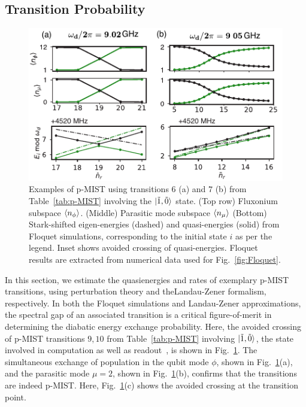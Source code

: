 \documentclass[%
reprint,
superscriptaddress,
 amsmath,amssymb,
 aps,
 prx,
longbibliography,
floatfix,
]{revtex4-2}
\begin{document}
\subsection{Transition Probability}
 \begin{figure}[htb]
    \centering
    \includegraphics[width=\linewidth]{Figures/Floquet_011.pdf}
    \caption{Examples of p-MIST using transitions $6$ (a) and $7$ (b) from Table~\ref{tab:p-MIST} involving the $\ket{\tilde{1},\tilde{0}}$ state. (Top row) Fluxonium subspace $\braket{n_\phi}$. (Middle) Parasitic mode subspace $\braket{n_\mu}$ (Bottom) Stark-shifted eigen-energies (dashed) and quasi-energies (solid) from Floquet simulations, corresponding to the initial state $i$ as per the legend. Inset shows avoided crossing of quasi-energies. Floquet results are extracted from numerical data used for Fig.~\ref{fig:Floquet}.}
    \label{fig:011}
\end{figure}
In this section, we estimate the quasienergies and rates of exemplary p-MIST transitions, using perturbation theory and theLandau-Zener formalism, respectively. In both the Floquet simulations and Landau-Zener approximations, the spectral gap of an associated transition is a critical figure-of-merit in determining the diabatic energy exchange probability. Here, the avoided crossing of p-MIST transitions $9,10$ from Table~\ref{tab:p-MIST} involving $\ket{\tilde{1},\tilde{0}}$, the state involved in computation as well as readout~\cite{zhang_universal_2021}, is shown in Fig.~\ref{fig:011}. The simultaneous exchange of population in the qubit mode $\phi$, shown in Fig.~\ref{fig:011}(a), and the parasitic mode $\mu=2$, shown in Fig.~\ref{fig:011}(b), confirms that the transitions are indeed p-MIST. Here,  Fig.~\ref{fig:011}(c) shows the avoided crossing at the transition point. 
\end{document}

